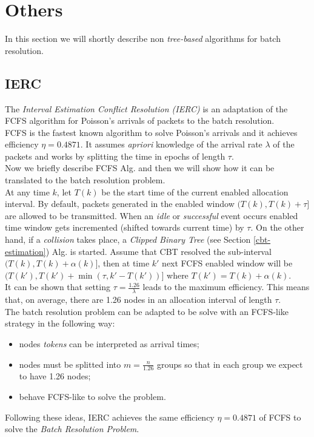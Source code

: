 \documentclass[11pt,a4paper,twoside,openright]{book}
\begin{document}
\section{Others}
In this section we will shortly describe non \emph{tree-based} algorithms for batch resolution.
\subsection{IERC}
The \emph{Interval Estimation Conflict Resolution (IERC)} \cite{popovski} is an adaptation of the FCFS \cite{gallager} algorithm for Poisson's arrivals of packets to the batch resolution.\\
FCFS is the fastest known algorithm to solve Poisson's arrivals and it achieves efficiency $\eta=0.4871$.
It assumes \emph{apriori} knowledge of the arrival rate $\lambda$ of the packets and works by splitting the time in epochs of length $\tau$.\\
Now we briefly describe FCFS Alg. and then we will show how it can be translated to the batch resolution problem.\\ 

At any time $k$, let $T (k)$ be the start time of the current enabled allocation interval. By default, packets generated in the enabled window $(T(k),T(k)+\tau]$ are allowed to be transmitted.
When an \emph{idle} or \emph{successful} event occurs enabled time window gets incremented (shifted towards current time) by $\tau$. On the other hand, if a \emph{collision} takes place, a \emph{Clipped Binary Tree} (see Section \ref{cbt-estimation}) Alg. is started. Assume that CBT resolved the sub-interval $(T(k),T(k)+\alpha(k)]$, then at time $k'$ next FCFS enabled window will be $(T(k'),T(k')+\min(\tau,k'-T(k'))]$ where $T(k')=T(k)+\alpha(k)$.\\

It can be shown \cite{gallager} that setting  $\tau={\displaystyle \frac{1.26}{\lambda}}$ leads to the maximum efficiency. This means that, on average, there are 1.26 nodes in an allocation interval of length $\tau$.\\
The batch resolution problem can be adapted to be solve with an FCFS-like strategy in the following way:
\begin{itemize}
\item nodes \emph{tokens} can be interpreted as arrival times;
\item nodes must be splitted into $m={\displaystyle \frac{n}{1.26}}$ groups so that in each group we expect to have 1.26 nodes;
\item behave FCFS-like to solve the problem.
\end{itemize}
Following  these ideas, IERC achieves the same efficiency $\eta=0.4871$ of FCFS to solve the \emph{Batch Resolution Problem}.
\end{document}
